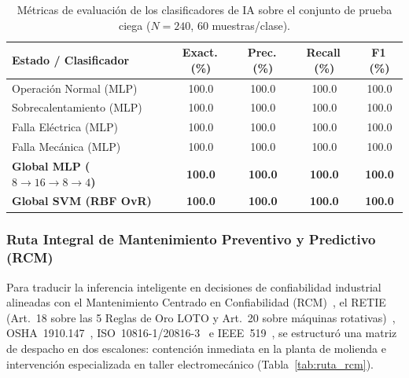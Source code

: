 \begin{table}[!t]
\begingroup\setlength{\tabcolsep}{2.8pt}\renewcommand{\arraystretch}{1.06}
\centering\footnotesize
\caption{Métricas de evaluación de los clasificadores de IA sobre el conjunto de prueba ciega ($N=240$, \num{60} muestras/clase).}
\label{tab:metricas_ia}
\begin{tabularx}{\columnwidth}{@{} >{\raggedright\arraybackslash}X cccc @{}}
\toprule
\textbf{Estado / Clasificador} & \textbf{Exact.\,(\%)} & \textbf{Prec.\,(\%)} & \textbf{Recall\,(\%)} & \textbf{F1\,(\%)} \\
\midrule
Operación Normal (MLP) & \num{100.0} & \num{100.0} & \num{100.0} & \num{100.0} \\
Sobrecalen\-tamiento (MLP) & \num{100.0} & \num{100.0} & \num{100.0} & \num{100.0} \\
Falla Eléctrica (MLP) & \num{100.0} & \num{100.0} & \num{100.0} & \num{100.0} \\
Falla Mecánica (MLP) & \num{100.0} & \num{100.0} & \num{100.0} & \num{100.0} \\
\midrule
\textbf{Global MLP ($8\to 16\to 8\to 4$)} & \textbf{\num{100.0}} & \textbf{\num{100.0}} & \textbf{\num{100.0}} & \textbf{\num{100.0}} \\
\textbf{Global SVM (RBF OvR)} & \textbf{\num{100.0}} & \textbf{\num{100.0}} & \textbf{\num{100.0}} & \textbf{\num{100.0}} \\
\bottomrule
\end{tabularx}
\endgroup
\end{table}

\subsubsection{Ruta Integral de Mantenimiento Preventivo y Predictivo (RCM)}
Para traducir la inferencia inteligente en decisiones de confiabilidad industrial alineadas con el Mantenimiento Centrado en Confiabilidad (RCM)~\cite{Moubray1997,Maintenance2023}, el RETIE (Art.~18 sobre las 5 Reglas de Oro LOTO y Art.~20 sobre máquinas rotativas)~\cite{RETIE2024,RETIE2026}, OSHA~1910.147~\cite{OSHA1910}, ISO~10816-1/20816-3~\cite{ISO10816,ISO20816} e IEEE~519~\cite{IEEE519}, se estructuró una matriz de despacho en dos escalones: contención inmediata en la planta de molienda e intervención especializada en taller electromecánico (Tabla~\ref{tab:ruta_rcm}).


